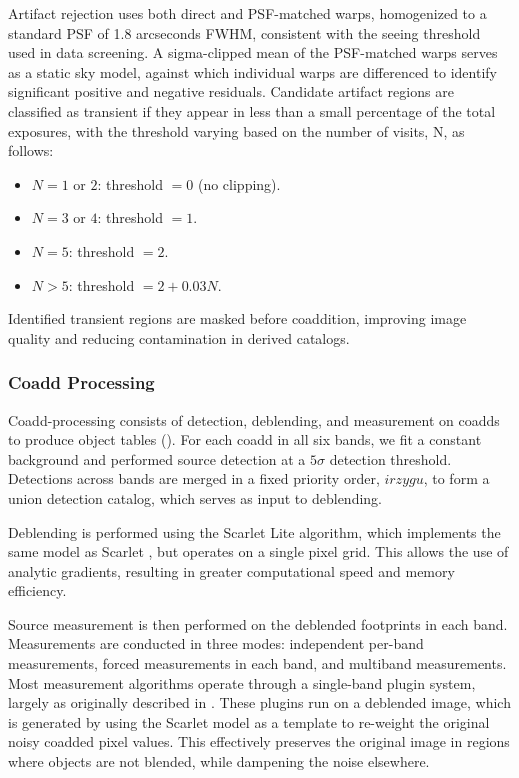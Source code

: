 Artifact rejection uses both direct and PSF-matched warps, homogenized to a standard PSF of 1.8 arcseconds FWHM,  consistent with the \gls{seeing} threshold used in data screening.
A sigma-clipped mean of the \gls{PSF}-matched warps serves as a static sky model, against which individual warps are differenced to identify significant positive and negative residuals.
Candidate artifact regions are classified as \gls{transient} if they appear in less than a small percentage of the total exposures, with the threshold varying based on the number of visits, N,  as follows:
\begin{itemize}
    \item $N=1$ or $2$: threshold $= 0$ (no clipping).
    \item $N=3$ or $4$: threshold $= 1$.
    \item $N=5$: threshold $= 2$.
    \item $N>5$: threshold $= 2+0.03N$.
\end{itemize}
Identified \gls{transient} regions are masked before coaddition, improving image quality and reducing contamination in derived catalogs.

\subsubsection{Coadd Processing}
\label{sssec:coadd_processing}
Coadd-processing consists of detection, \gls{deblend}ing, and  measurement on coadds to produce object tables ().
For each coadd in all six bands, we fit a constant \gls{background} and performed source detection at a $5\sigma$ detection threshold.
Detections across bands are merged in a fixed priority order, $irzygu$, to form a union detection catalog, which serves as input to deblending.

Deblending is performed using the Scarlet Lite algorithm, which implements the same model as Scarlet \citep{2018A&C....24..129M}, but operates on a single pixel grid.
This allows the use of analytic gradients, resulting in greater computational speed and memory efficiency.

\gls{Source} measurement is then performed on the deblended footprints in each band.
Measurements are conducted in three modes: independent per-band measurements, forced measurements in each band, and multiband measurements.
Most measurement algorithms operate through a single-band plugin system, largely as originally described in \citet{2018PASJ...70S...5B}.
These plugins run on a deblended image, which is generated by using the Scarlet model as a template to re-weight the original noisy coadded pixel values.
This effectively preserves the original image in regions where objects are not blended, while dampening the noise elsewhere.

